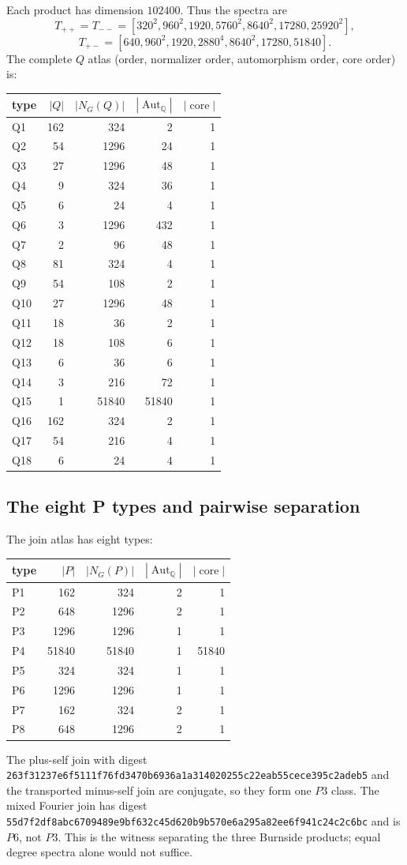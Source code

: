 \documentclass[11pt]{article}
\newcommand{\Q}{\mathbb Q}
\newcommand{\sha}[1]{\texttt{\scriptsize #1}}
\begin{document}
Each product has dimension $102400$.  Thus the spectra are
\[
T_{++}=T_{--}=[320^2,960^2,1920,5760^2,8640^2,17280,25920^2],
\]
\[
T_{+-}=[640,960^2,1920,2880^4,8640^2,17280,51840].
\]
The complete $Q$ atlas (order, normalizer order, automorphism order, core order) is:
\begin{center}\small
\begin{tabular}{@{}lrrrr@{}}\toprule type&$|Q|$&$|N_G(Q)|$&$|\operatorname{Aut}_\Q|$&$|\operatorname{core}|$\\\midrule
Q1&162&324&2&1\\Q2&54&1296&24&1\\Q3&27&1296&48&1\\Q4&9&324&36&1\\Q5&6&24&4&1\\Q6&3&1296&432&1\\Q7&2&96&48&1\\Q8&81&324&4&1\\Q9&54&108&2&1\\Q10&27&1296&48&1\\Q11&18&36&2&1\\Q12&18&108&6&1\\Q13&6&36&6&1\\Q14&3&216&72&1\\Q15&1&51840&51840&1\\Q16&162&324&2&1\\Q17&54&216&4&1\\Q18&6&24&4&1\\\bottomrule\end{tabular}\end{center}

\subsection{The eight P types and pairwise separation}
The join atlas has eight types:
\begin{center}\small
\begin{tabular}{@{}lrrrr@{}}\toprule type&$|P|$&$|N_G(P)|$&$|\operatorname{Aut}_\Q|$&$|\operatorname{core}|$\\\midrule
P1&162&324&2&1\\P2&648&1296&2&1\\P3&1296&1296&1&1\\P4&51840&51840&1&51840\\P5&324&324&1&1\\P6&1296&1296&1&1\\P7&162&324&2&1\\P8&648&1296&2&1\\\bottomrule\end{tabular}\end{center}
The plus-self join with digest \sha{263f31237e6f5111f76fd3470b6936a1a314020255c22eab55cece395c2adeb5}
and the transported minus-self join are conjugate, so they form one $P3$ class.  The mixed
Fourier join has digest \sha{55d7f2df8abc6709489e9bf632c45d620b9b570e6a295a82ee6f941c24c2c6bc}
and is $P6$, not $P3$.  This is the witness separating the three Burnside products; equal
degree spectra alone would not suffice.
\end{document}
